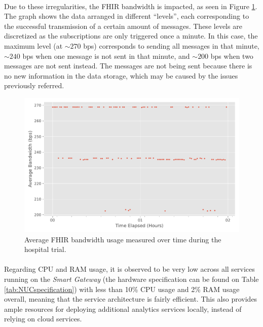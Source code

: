 \paragraph{} Due to these irregularities, the \acs{FHIR} bandwidth is impacted, as seen in Figure \ref{fig:pilot-fhir-bandwidth}. The graph shows the data arranged in different ``levels'', each corresponding to the successful transmission of a certain amount of messages. These levels are discretized as the subscriptions are only triggered once a minute. In this case, the maximum level (at ${\sim}  270$ bps) corresponds to sending all messages in that minute, ${\sim}  240$ bps when one message is not sent in that minute, and ${\sim}  200$ bps when two messages are not sent instead. The messages are not being sent because there is no new information in the data storage, which may be caused by the issues previously referred.

\begin{figure}[H]
    \centering
    \includegraphics[width=0.85\linewidth]{images/pilot_fhir_bandwidth.pdf}
    \caption{Average \acs{FHIR} bandwidth usage measured over time during the hospital trial.}
    \label{fig:pilot-fhir-bandwidth}
\end{figure}

\paragraph{} Regarding \acs{CPU} and \acs{RAM} usage, it is observed to be very low across all services running on the \textit{Smart Gateway} (the hardware specification can be found on Table \ref{tab:NUCspecification}) with less than 10\% \acs*{CPU} usage and 2\% \acs*{RAM} usage overall, meaning that the service architecture is fairly efficient. This also provides ample resources for deploying additional analytics services locally, instead of relying on cloud services.  

